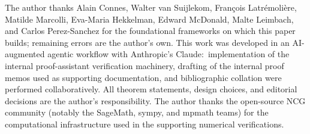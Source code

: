 \documentclass[11pt,a4paper]{article}
\theoremstyle{plain}
\theoremstyle{definition}
\begin{document}
The author thanks Alain Connes, Walter van Suijlekom, Fran\c{c}ois
Latr\'emoli\`ere, Matilde Marcolli, Eva-Maria Hekkelman, Edward
McDonald, Malte Leimbach, and Carlos Perez-Sanchez for the
foundational frameworks on which this paper builds; remaining errors
are the author's own. This work was developed in an AI-augmented
agentic workflow with Anthropic's Claude:\ implementation of the
internal proof-assistant verification machinery, drafting of the
internal proof memos used as supporting documentation, and
bibliographic collation were performed collaboratively. All theorem
statements, design choices, and editorial decisions are the author's
responsibility. The author thanks the open-source NCG community
(notably the SageMath, sympy, and mpmath teams) for the computational
infrastructure used in the supporting numerical verifications.
\end{document}
